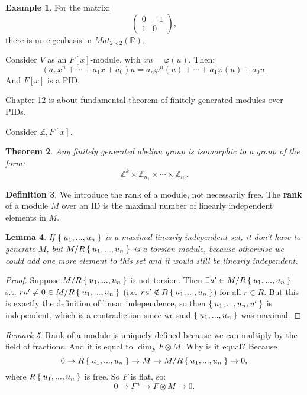 \documentclass[12pt]{amsbook}
\theoremstyle{plain}
\newtheorem{theorem}{Theorem}[chapter]
\numberwithin{section}{chapter}
\numberwithin{equation}{chapter}
\newtheorem{lem}[theorem]{Lemma}
\theoremstyle{definition}
\newtheorem{Def}[theorem]{Definition}
\newtheorem{Ex}[theorem]{Example}
\theoremstyle{remark}
\newtheorem{rem}[theorem]{Remark}
\newcommand{\R}{\mathbb{R}}
\newcommand{\z}{\mathbb{Z}}
\newcommand{\bb}{\vspace{3mm}}
\newcommand{\tens}{\otimes}
\newcommand{\lpar}{\left(}
\newcommand{\rpar}{\right)}
\renewcommand{\phi}{\varphi}
\begin{document}
\begin{Ex}
For the matrix:
$$
\lpar 
\begin{matrix}
0 & -1\\
1 & 0
\end{matrix} \rpar,
$$
there is no eigenbasis in $Mat_{2 \times 2}(\R)$. 
\end{Ex}

Consider $V$ as an $F[x]$-module, with $xu = \phi(u)$. Then:
$$
(a_nx^n + \cdots + a_1x + a_0)u = a_n\phi^n(u) + \cdots + a_1 \phi(u) + a_0u.
$$
And $F[x]$ is a PID. 

\bb\bb
Chapter 12 is about fundamental theorem of finitely generated modules over PIDs. 

Consider $\z,F[x]$. 

\begin{theorem}
Any finitely generated abelian group is isomorphic to a group of the form:
$$
\z^k \times \z_{n_1} \times \cdots \times \z_{n_l}.
$$
\end{theorem}

\begin{Def}
We introduce the rank of a module, not necessarily free. The \textbf{rank} of a module $M$ over an ID is the maximal number of linearly independent elements in $M$. 
\end{Def}

\begin{lem}
If $\Set{u_1,...,u_n}$ is a maximal linearly independent set, it don't have to generate $M$, but $M/R\Set{u_1,...,u_n}$ is a torsion module, because otherwise we could add one more element to this set and it would still be linearly independent. 
\end{lem}

\begin{proof}
Suppose $M/R\Set{u_1,...,u_n}$ is not torsion. Then $\exists u' \in M/R\Set{u_1,...,u_n}$ s.t. $ru' \neq 0 \in M/R\Set{u_1,...,u_n}$ (i.e. $ru' \notin R\Set{u_1,...,u_n}$) for all $r \in R$. But this is exactly the definition of linear independence, so then $\Set{u_1,...,u_n,u'}$ is independent, which is a contradiction since we said $\Set{u_1,...,u_n}$ was maximal. 
\end{proof}

\begin{rem}
Rank of a module is uniquely defined because we can multiply by the field of fractions. And it is equal to $\dim_FF \tens M$. Why is it equal? Because 
$$
0 \to R\Set{u_1,...,u_n} \to M \to M/R\Set{u_1,...,u_n} \to 0,
$$
where $R\Set{u_1,...,u_n}$ is free. So $F$ is flat, so:
$$
0 \to F^n \to F\tens M \to 0.
$$
\end{rem}
\end{document}
